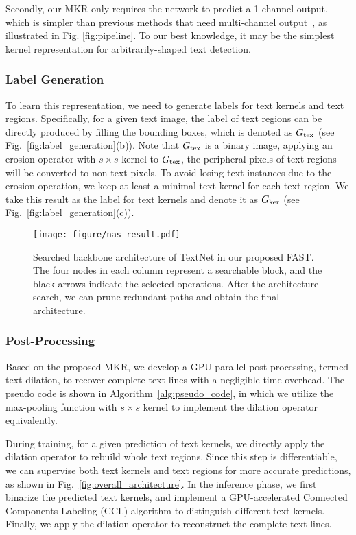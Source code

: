 \documentclass[lettersize,journal]{IEEEtran}
\begin{document}
Secondly, our MKR only requires the network to predict a 1-channel output, which is simpler than previous methods that need multi-channel output~\cite{liao2020real,wang2019shape,wang2019efficient}, as illustrated in Fig. \ref{fig:pipeline}.
To our best knowledge, it may be the simplest kernel representation for arbitrarily-shaped text detection.



\subsubsection{Label Generation}
To learn this representation, we need to generate labels for text kernels and text regions.
Specifically, for a given text image, the label of text regions can be directly produced by filling the bounding boxes, which is denoted as $G_{\rm tex}$ (see Fig.~\ref{fig:label_generation}(b)). 
Note that $G_{\rm tex}$ is a binary image, 
applying an erosion operator with $s\times s$ kernel to $G_{\rm tex}$, the peripheral pixels of text regions will be converted to non-text pixels.
To avoid losing text instances due to the erosion operation, we keep at least a minimal text kernel for each text region.
We take this result as the label for text kernels and denote it as $G_{\rm ker}$ (see Fig.~\ref{fig:label_generation}(c)). 

\begin{figure*}[t]
    \centering
\texttt{[image: figure/nas\_result.pdf]}
    \caption{
    Searched backbone architecture of TextNet in our proposed FAST.
    The four nodes in each column represent a searchable block, and the black arrows indicate the selected operations.
    After the architecture search, we can prune redundant paths and obtain the final architecture.
    }
\label{fig:nas_result}
\end{figure*}


\subsubsection{Post-Processing}
Based on the proposed MKR, we develop a GPU-parallel post-processing, termed text dilation, to recover complete text lines with a negligible time overhead. The pseudo code is shown in Algorithm~\ref{alg:pseudo_code}, in which we utilize the max-pooling function with $s\times s$ kernel to implement the dilation operator equivalently.

During training, for a given prediction of text kernels, we directly apply the dilation operator to rebuild whole text regions.
Since this step is differentiable, we can supervise both text kernels and text regions for more accurate predictions, as shown in Fig.~\ref{fig:overall_architecture}.
In the inference phase, we first binarize the predicted text kernels, and implement a GPU-accelerated Connected Components Labeling (CCL) algorithm \cite{allegretti2019optimized} to distinguish different text kernels.
Finally, we apply the dilation operator to reconstruct the complete text lines.
\end{document}
